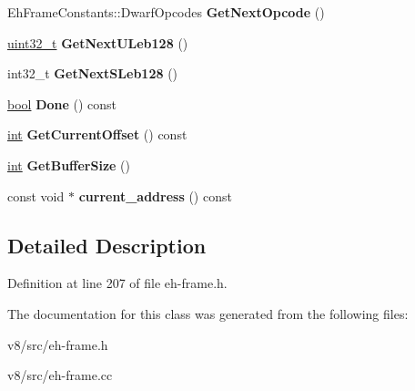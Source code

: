 \begin{DoxyCompactItemize}
\item 
\mbox{\label{classv8_1_1internal_1_1EhFrameIterator_aa8202940ae5c96866677ac421b6b2115}} 
Eh\+Frame\+Constants\+::\+Dwarf\+Opcodes {\bfseries Get\+Next\+Opcode} ()
\item 
\mbox{\label{classv8_1_1internal_1_1EhFrameIterator_adb20dcec9670d74b14881ad6832dc1ad}} 
\mbox{\hyperlink{classuint32__t}{uint32\+\_\+t}} {\bfseries Get\+Next\+U\+Leb128} ()
\item 
\mbox{\label{classv8_1_1internal_1_1EhFrameIterator_a6cad4f6143ab3b24ac8eff1022b22b3c}} 
int32\+\_\+t {\bfseries Get\+Next\+S\+Leb128} ()
\item 
\mbox{\label{classv8_1_1internal_1_1EhFrameIterator_a54b215c575aa01c89ba58d328da3ded1}} 
\mbox{\hyperlink{classbool}{bool}} {\bfseries Done} () const
\item 
\mbox{\label{classv8_1_1internal_1_1EhFrameIterator_aae32f25757744560a5f30bfd79fb7bbf}} 
\mbox{\hyperlink{classint}{int}} {\bfseries Get\+Current\+Offset} () const
\item 
\mbox{\label{classv8_1_1internal_1_1EhFrameIterator_a0bfca86398df5ca39ab8ada319079f91}} 
\mbox{\hyperlink{classint}{int}} {\bfseries Get\+Buffer\+Size} ()
\item 
\mbox{\label{classv8_1_1internal_1_1EhFrameIterator_a9374313b8c577aace2a3da542d6f3285}} 
const void $\ast$ {\bfseries current\+\_\+address} () const
\end{DoxyCompactItemize}


\subsection{Detailed Description}


Definition at line 207 of file eh-\/frame.\+h.



The documentation for this class was generated from the following files\+:\begin{DoxyCompactItemize}
\item 
v8/src/eh-\/frame.\+h\item 
v8/src/eh-\/frame.\+cc\end{DoxyCompactItemize}
